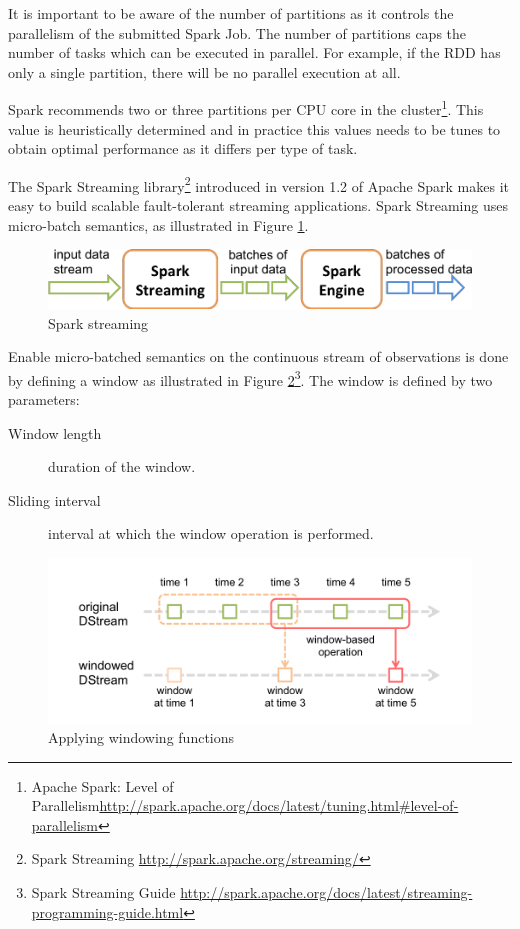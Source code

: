 It is important to be aware of the number of partitions as it controls the parallelism of the submitted Spark Job. The number of partitions caps the number of tasks which can be executed in parallel. For example, if the RDD has only a single partition, there will be no parallel execution at all.

Spark recommends two or three partitions per CPU core in the cluster\footnote{Apache Spark: Level of Parallelism\url{http://spark.apache.org/docs/latest/tuning.html\#level-of-parallelism}}. This value is heuristically determined and in practice this values needs to be tunes to obtain optimal performance as it differs per type of task.

The Spark Streaming library\footnote{Spark Streaming \url{http://spark.apache.org/streaming/}} introduced in version 1.2 of Apache Spark makes it easy to build scalable fault-tolerant streaming applications. Spark Streaming uses micro-batch semantics, as illustrated in Figure \ref{fig:streaming}.

\begin{figure}[ht!]
\centering
\includegraphics[width=.9\textwidth]{figures/flow.png}
\caption{Spark streaming \label{fig:streaming}}
\end{figure}

Enable micro-batched semantics on the continuous stream of observations is done by defining a window as illustrated in Figure \ref{fig:streamingWindow}\footnote{Spark Streaming Guide \url{http://spark.apache.org/docs/latest/streaming-programming-guide.html}}. The window is defined by two parameters:
\begin{description}
  \item[Window length] duration of the window.
  \item[Sliding interval] interval at which the window operation is performed.
\end{description}

\begin{figure}[ht!]
\centering
\includegraphics[width=.9\textwidth]{figures/window.png}
\caption{Applying windowing functions \label{fig:streamingWindow}}
\end{figure}

